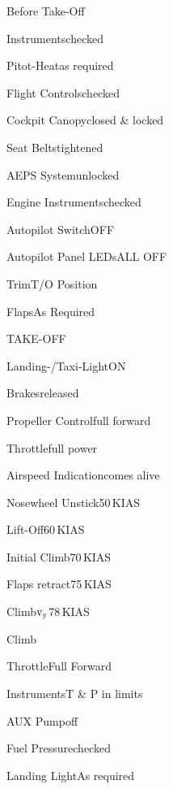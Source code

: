 \begin{checklist}{Before Take-Off}
  \item{Instruments}{checked}
  \item{Pitot-Heat}{as required}
  \item{Flight Controls}{checked}
  \item{Cockpit Canopy}{closed \& locked}
  \item{Seat Belts}{tightened}
  \item{AEPS System}{unlocked}
  \item{Engine Instruments}{checked}
  \item{Autopilot Switch}{OFF}
  \item{Autopilot Panel LEDs}{ALL OFF}
  \item{Trim}{T/O Position}
  \item{Flaps}{As Required}
\end{checklist}

\begin{checklist}{TAKE-OFF}
  \item{Landing-/Taxi-Light}{ON}
  \item{Brakes}{released}
  \item{Propeller Control}{full forward}
  \item{Throttle}{full power}
  \item{Airspeed Indication}{comes alive}
  \item{Nosewheel Unstick}{50\,KIAS}
  \item{Lift-Off}{60\,KIAS}
  \item{Initial Climb}{70\,KIAS}
  \item{Flaps retract}{75\,KIAS}
  \item{Climb}{$\mathrm{\lowercase{v}}_{\mathrm{\lowercase{y}}}$78\,KIAS}
\end{checklist}

\begin{checklist}{Climb}
  \item{Throttle}{Full Forward}
  \item{Instruments}{T \& P in limits}
  \item{AUX Pump}{off}
  \item{Fuel Pressure}{checked}
  \item{Landing Light}{As required}
\end{checklist}

